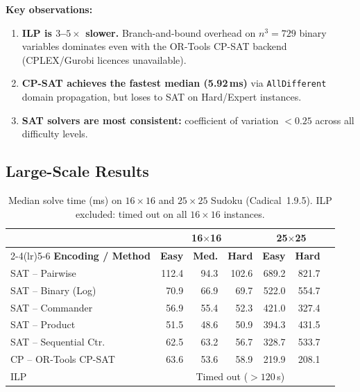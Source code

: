 \documentclass[preprint,10pt,authoryear]{elsarticle}
\begin{document}
\noindent\textbf{Key observations:}
\begin{enumerate}
  \item \textbf{ILP is $3$--$5\times$ slower.}  Branch-and-bound overhead
        on $n^3 = 729$ binary variables dominates even with the OR-Tools
        CP-SAT backend (CPLEX/Gurobi licences unavailable).
  \item \textbf{CP-SAT achieves the fastest median (5.92\,ms)} via
        \texttt{AllDifferent} domain propagation, but loses to SAT on
        Hard/Expert instances.
  \item \textbf{SAT solvers are most consistent:} coefficient of variation
        $< 0.25$ across all difficulty levels.
\end{enumerate}

\subsection{Large-Scale Results}
\label{sec:large}

\begin{table}[H]
\centering
\caption{Median solve time (ms) on $16\times16$ and $25\times25$ Sudoku
(Cadical~1.9.5). ILP excluded: timed out on all $16\times16$ instances.}
\label{tab:large}
\small
\begin{tabular}{lrrrrrr}
\toprule
 & \multicolumn{3}{c}{\textbf{16$\times$16}}
 & \multicolumn{2}{c}{\textbf{25$\times$25}}\\
\cmidrule(lr){2-4}\cmidrule(lr){5-6}
\textbf{Encoding / Method}
  & \textbf{Easy} & \textbf{Med.} & \textbf{Hard}
  & \textbf{Easy} & \textbf{Hard}\\
\midrule
SAT -- Pairwise        & 112.4 &  94.3 & 102.6 & 689.2 & 821.7\\
SAT -- Binary (Log)    &  70.9 &  66.9 &  69.7 & 522.0 & 554.7\\
SAT -- Commander       &  56.9 &  55.4 &  52.3 & 421.0 & 327.4\\
SAT -- Product         &  51.5 &  48.6 &  50.9 & 394.3 & 431.5\\
SAT -- Sequential Ctr. &  62.5 &  63.2 &  56.7 & 328.7 & 533.7\\
\midrule
CP -- OR-Tools CP-SAT  &  63.6 &  53.6 &  58.9 & 219.9 & 208.1\\
ILP                    & \multicolumn{5}{c}{Timed out ($> 120$\,s)}\\
\bottomrule
\end{tabular}
\end{table}
\end{document}
